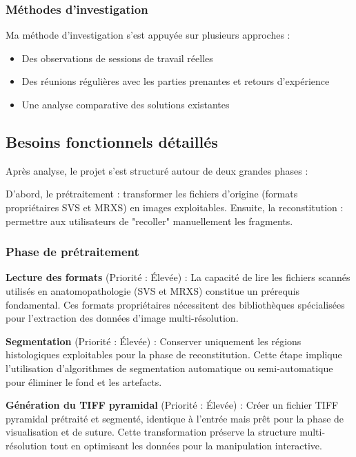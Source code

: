 \documentclass[11pt,a4paper]{report}
\begin{document}
\subsubsection{Méthodes d'investigation}

Ma méthode d'investigation s'est appuyée sur plusieurs approches :
\begin{itemize}
\item Des observations de sessions de travail réelles
\item Des réunions régulières avec les parties prenantes et retours d'expérience
\item Une analyse comparative des solutions existantes
\end{itemize}

\subsection{Besoins fonctionnels détaillés}

Après analyse, le projet s'est structuré autour de deux grandes phases :

D'abord, le prétraitement : transformer les fichiers d'origine (formats propriétaires SVS et MRXS) en images exploitables. Ensuite, la reconstitution : permettre aux utilisateurs de "recoller" manuellement les fragments.

\subsubsection{Phase de prétraitement}

\textbf{Lecture des formats} (Priorité : Élevée) : La capacité de lire les fichiers scannés utilisés en anatomopathologie (SVS et MRXS) constitue un prérequis fondamental. Ces formats propriétaires nécessitent des bibliothèques spécialisées pour l'extraction des données d'image multi-résolution.

\textbf{Segmentation} (Priorité : Élevée) : Conserver uniquement les régions histologiques exploitables pour la phase de reconstitution. Cette étape implique l'utilisation d'algorithmes de segmentation automatique ou semi-automatique pour éliminer le fond et les artefacts.

\textbf{Génération du TIFF pyramidal} (Priorité : Élevée) : Créer un fichier TIFF pyramidal prétraité et segmenté, identique à l'entrée mais prêt pour la phase de visualisation et de suture. Cette transformation préserve la structure multi-résolution tout en optimisant les données pour la manipulation interactive.
\end{document}
